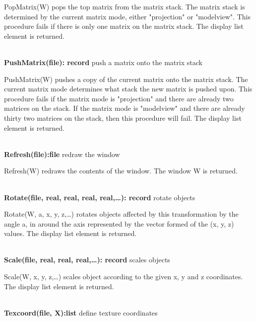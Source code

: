 \documentclass[letterpaper]{article}
\begin{document}
{\bigskip

\textsf{PopMatrix(W)} pops the top matrix from the matrix stack. The
matrix stack is determined by the current matrix mode, either
\textsf{"projection"} or \textsf{"modelview"}. This procedure fails if
there is only one matrix on the matrix stack. The display list element
is returned.

\noindent\hrulefill\\
\noindent\textsf{\textbf{PushMatrix(file): record}}
\hfill push a matrix onto the matrix stack


\bigskip

\textsf{PushMatrix(W)} pushes a copy of the current matrix onto the
matrix stack. The current matrix mode determines what stack the new
matrix is pushed upon. This procedure fails if the matrix mode is
\textsf{"projection"} and there are already two matrices on the
stack. If the matrix mode is \textsf{"modelview"} and there are
already thirty two matrices on the stack, then this procedure will
fail. The display list element is returned.

\noindent\hrulefill\\
\noindent\textsf{\textbf{Refresh(file):file}} \hfill redraw the window


\bigskip

\textsf{Refresh(W)} redraws the contents of the window.
The window W is returned.

\noindent\hrulefill\\
\noindent\textsf{\textbf{Rotate(file, real, real, real, real,{\dots}): record}}
\hfill rotate objects


\bigskip

\textsf{Rotate(W, a, x, y, z,{\dots})} rotates objects affected by
this transformation by the angle a, in around the axis represented by
the vector formed of the (x, y, z) values. The display list element is
returned.

\noindent\hrulefill\\
\noindent\textsf{\textbf{Scale(file, real, real, real,{\dots}): record}} \hfill
scales objects


\bigskip

\textsf{Scale(W, x, y, z,{\dots})} scales object according to the
given x, y and z coordinates. The display list element is returned.

\noindent\hrulefill\\
\noindent\textsf{\textbf{Texcoord(file, X):list}}
\hfill define texture coordinates


\bigskip

}
\end{document}
